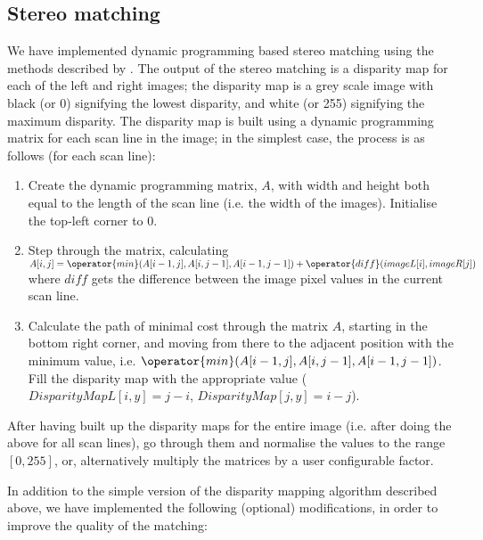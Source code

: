 
\subsection{Stereo matching}
\label{sec:stereo}
We have implemented dynamic programming based stereo matching using the methods
described by \citet{realtimestereo}. The output of the stereo matching is a
disparity map for each of the left and right images; the disparity map is a grey
scale image with black (or 0) signifying the lowest disparity, and white (or
255) signifying the maximum disparity. The disparity map is built using a
dynamic programming matrix for each scan line in the image; in the simplest
case, the process is as follows (for each scan line):

\begin{enumerate}
\item Create the dynamic programming matrix, $A$, with width and height both
  equal to the length of the scan line (i.e. the width of the images).
  Initialise the top-left corner to 0.

\item Step through the matrix, calculating $A[i,j] = \operator{min}(A[i-1,j],
  A[i,j-1], A[i-1,j-1])  +  \operator{diff}(imageL[i], imageR[j])$ where $diff$
  gets the difference between the image pixel values in the current scan line.

\item Calculate the path of minimal cost through the matrix $A$, starting in the
  bottom right corner, and moving from there to the adjacent position with the
  minimum value, i.e. $\operator{min}(A[i-1,j], A[i,j-1], A[i-1,j-1])$. Fill the
  disparity map with the appropriate value ($DisparityMapL[i,y]=j-i$,
  $DisparityMap[j,y]=i-j$).
\end{enumerate}

After having built up the disparity maps for the entire image (i.e. after doing
the above for all scan lines), go through them and normalise the values to the
range $[0,255]$, or, alternatively multiply the matrices by a user configurable
factor.

In addition to the simple version of the disparity mapping algorithm described
above, we have implemented the following (optional) modifications, in order to
improve the quality of the matching:

